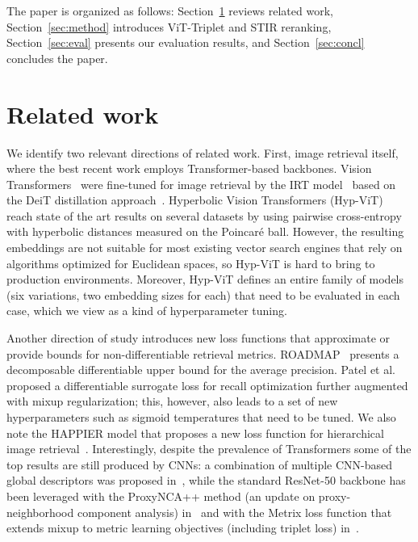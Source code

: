 \documentclass{article}
\begin{document}
The paper is organized as follows: Section~\ref{sec:related} reviews related work, Section~\ref{sec:method} introduces ViT-Triplet and STIR reranking, Section~\ref{sec:eval} presents our evaluation results, and Section~\ref{sec:concl} concludes the paper.


\section{Related work}\label{sec:related}

We identify two relevant directions of related work. 
First, image retrieval itself, where the best recent work employs Transformer-based backbones. Vision Transformers~\cite{DBLP:journals/corr/abs-2010-11929} were fine-tuned for image retrieval by the IRT model~\cite{DBLP:journals/corr/abs-2102-05644} based on the DeiT distillation approach~\cite{pmlr-v139-touvron21a}. Hyperbolic Vision Transformers (Hyp-ViT)~\cite{9880306} reach state of the art results on several datasets by using pairwise cross-entropy with hyperbolic distances measured on the Poincar{\'e} ball. However, the resulting embeddings are not suitable for most existing vector search engines that rely on algorithms optimized for Euclidean spaces, so Hyp-ViT is hard to bring to production environments. Moreover, Hyp-ViT defines an entire family of models (six variations, two embedding sizes for each) that need to be evaluated in each case, which we view as a kind of hyperparameter tuning.

Another direction of study introduces new loss functions that approximate or provide bounds for non-differentiable retrieval metrics. ROADMAP~\cite{NEURIPS2021_c622c085} presents a decomposable differentiable upper bound for the average precision. Patel et al.~\cite{patel2022recall} proposed a differentiable surrogate loss for recall optimization further augmented with mixup regularization; this, however, also leads to a set of new hyperparameters such as sigmoid temperatures that need to be tuned. We also note the HAPPIER model that proposes a new loss function for hierarchical image retrieval~\cite{ramzi2022hierarchical}. Interestingly, despite the prevalence of Transformers some of the top results are still produced by CNNs: a combination of multiple CNN-based global descriptors was proposed in~\cite{DBLP:journals/corr/abs-1903-10663}, while the standard ResNet-50 backbone has been leveraged with the ProxyNCA++ method (an update on proxy-neighborhood component analysis) in~\cite{10.1007/978-3-030-58586-0_27} and with the Metrix loss function that extends mixup to metric learning objectives (including triplet loss) in~\cite{venkataramanan2022it}.
\end{document}
